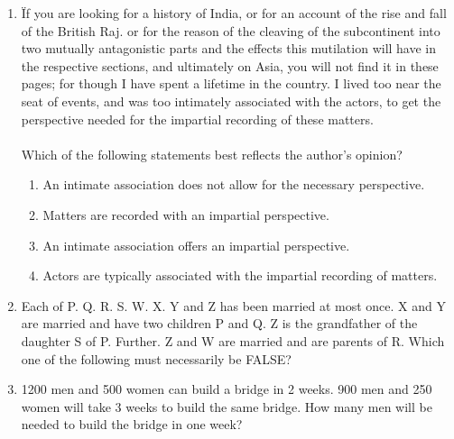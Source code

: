 \documentclass[journal,12pt,onecolumn]{IEEEtran}
\theoremstyle{remark}
\begin{document}
\begin{enumerate}
\begin{enumerate}
\end{enumerate}
\item \"If you are looking for a history of India, or for an account of the rise and fall of the British Raj. or for the reason of the cleaving of the subcontinent into two mutually antagonistic parts and the effects this mutilation will have in the respective sections, and ultimately on Asia, you will not find it in these pages; for though I have spent a lifetime in the country. I lived too near the seat of events, and was too intimately associated with the actors, to get the perspective needed for the impartial recording of these matters.\"\\\\
Which of the following statements best reflects the author's opinion?
\begin{enumerate}
\item An intimate association does not allow for the necessary perspective.
\item Matters are recorded with an impartial perspective.
\item An intimate association offers an impartial perspective.
\item Actors are typically associated with the impartial recording of matters.
\end{enumerate}
\item Each of P. Q. R. S. W. X. Y and Z has been married at most once. X and Y are married and have two children P and Q. Z is the grandfather of the daughter S of P. Further. Z and W are married and are parents of R. Which one of the following must necessarily be FALSE?
\begin{enumerate}
\end{enumerate}
\item 1200 men and 500 women can build a bridge in 2 weeks. 900 men and 250 women will take 3 weeks to build the same bridge. How many men will be needed to build the bridge in one week?

\end{enumerate}
\end{document}
